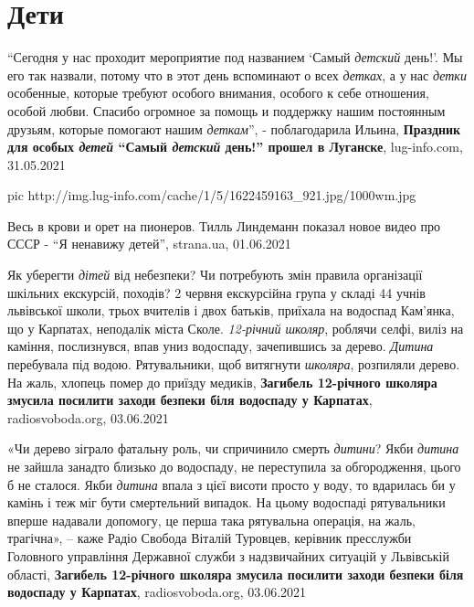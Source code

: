  
 
 
 
 
\chapter{Дети}
\label{sec:slova.deti}

\enquote{Сегодня у нас проходит мероприятие под названием \enquote{Самый
\emph{детский} день!}. Мы его так назвали, потому что в этот день вспоминают о
всех \emph{детках}, а у нас \emph{детки} особенные, которые требуют особого
внимания, особого к себе отношения, особой любви. Спасибо огромное за помощь и
поддержку нашим постоянным друзьям, которые помогают нашим \emph{деткам}}, -
поблагодарила Ильина, \textbf{Праздник для особых \emph{детей} \enquote{Самый
\emph{детский} день!} прошел в Луганске}, lug-info.com, 31.05.2021

\ifcmt
  pic http://img.lug-info.com/cache/1/5/1622459163_921.jpg/1000wm.jpg
\fi

Весь в крови и орет на пионеров. Тилль Линдеманн показал новое видео про СССР -
\enquote{Я ненавижу детей}, strana.ua, 01.06.2021

Як уберегти \emph{дітей} від небезпеки? Чи потребують змін правила організації
шкільних екскурсій, походів?  2 червня екскурсійна група у складі 44 учнів
львівської школи, трьох вчителів і двох батьків, приїхала на водоспад Кам'янка,
що у Карпатах, неподалік міста Сколе. \emph{12-річний школяр}, роблячи селфі,
виліз на каміння, послизнувся, впав униз водоспаду, зачепившись за дерево.
\emph{Дитина} перебувала під водою. Рятувальники, щоб витягнути \emph{школяра},
розпиляли дерево. На жаль, хлопець помер до приїзду медиків,
\textbf{Загибель 12-річного школяра змусила посилити заходи безпеки біля водоспаду у Карпатах},
radiosvoboda.org, 03.06.2021

«Чи дерево зіграло фатальну роль, чи спричинило смерть \emph{дитини}? Якби \emph{дитина} не
зайшла занадто близько до водоспаду, не переступила за обгородження, цього б не
сталося. Якби \emph{дитина} впала з цієї висоти просто у воду, то вдарилась би у
камінь і теж міг бути смертельний випадок. На цьому водоспаді рятувальники
вперше надавали допомогу, це перша така рятувальна операція, на жаль,
трагічна», – каже Радіо Свобода Віталій Туровцев, керівник пресслужби Головного
управління Державної служби з надзвичайних ситуацій у Львівській області,
\textbf{Загибель 12-річного школяра змусила посилити заходи безпеки біля водоспаду у Карпатах},
radiosvoboda.org, 03.06.2021

